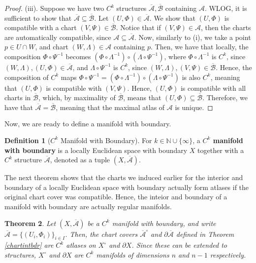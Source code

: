 \documentclass{article}
\newcommand{\N}{\mathbb{N}}
\newcommand{\cl}[1]{\overline{#1}}
\newcommand{\bdr}{\partial}
\newcommand{\atl}[1]{\mathcal{#1}}
\newcommand{\str}[1]{\cl{\atl{#1}}}
\theoremstyle{plain} %
\newtheorem{thm}{Theorem}
\numberwithin{thm}{section} %
\theoremstyle{definition} %
\newtheorem{defn}[thm]{Definition}
\begin{document}
\begin{proof}
(iii). Suppose we have two $C^k$ structures $\cl{\atl{A}}, \cl{\atl{B}}$ containing $\atl{A}$. WLOG, it is sufficient to show that $\cl{\atl{A}} \subseteq \cl{\atl{B}}$. Let $(U, \Phi) \in \str{A}$. We show that $(U, \Phi)$ is compatible with a chart $(V, \Psi) \in \str{B}$. Notice that if $(V, \Psi) \in \atl{A}$, then the charts are automatically compatible, since $\atl{A} \subseteq \str{A}$. Now, similarly to (i), we take a point $p \in U \cap W$, and chart $(W, \Lambda) \in \atl{A}$ containing $p$. Then, we have that locally, the composition $\Phi \circ \Psi^{-1}$ becomes $(\Phi \circ \Lambda^{-1}) \circ (\Lambda \circ \Psi^{-1})$, where $\Phi \circ \Lambda^{-1}$ is $C^k$, since $(W, \Lambda), (U, \Phi) \in \str{A}$, and $\Lambda \circ \Psi^{-1}$ is $C^k$, since $(W, \Lambda), (V, \Psi) \in \str{B}$. Hence, the composition of $C^k$ maps $\Phi \circ \Psi^{-1} = (\Phi \circ \Lambda^{-1}) \circ (\Lambda \circ \Psi^{-1})$ is also $C^k$, meaning that $(U, \Phi)$ is compatible with $(V, \Psi)$. Hence, $(U, \Phi)$ is compatible with all charts in $\str{B}$, which, by maximality of $\str{B}$, means that $(U, \Phi) \subseteq \str{B}$. Therefore, we have that $\str{A} = \str{B}$, meaning that the maximal atlas of $\atl{A}$ is unique.
\end{proof}

Now, we are ready to define a manifold with boundary.

\begin{defn}[$C^k$ Manifold with Boundary]
    For $k \in \N \cup \{\infty\}$, a \textbf{$C^k$ manifold with boundary} is a locally Euclidean space with boundary $X$ together with a $C^k$ structure $\str{A}$, denoted as a tuple $(X, \str{A})$.
\end{defn}

The next theorem shows that the charts we induced earlier for the interior and boundary of a locally Euclidean space with boundary actually form atlases if the original chart cover was compatible. Hence, the inteior and boundary of a manifold with boundary are actually regular manifolds.

\begin{thm}
    \label{atlintbdr}
    Let $(X, \str{A})$ be a $C^k$ manifold with boundary, and write $\str{A} = \{(U_i, \Phi_i)\}_{i \in I}$. Then, the chart covers $\str{A}^\circ$ and $\bdr\str{A}$ defined in Theorem \ref{chartintbdr} are $C^k$ atlases on $X^\circ$ and $\bdr X$. Since these can be extended to structures, $X^\circ$ and $\bdr X$ are $C^k$ manifolds of dimensions $n$ and $n - 1$ respectively.
\end{thm}
\end{document}
